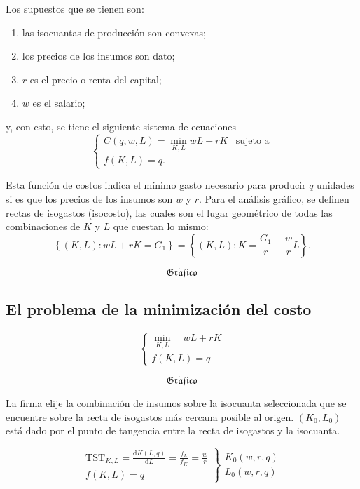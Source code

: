 \documentclass{report}
\newcommand{\GRAF}{\begin{center}$$\mathfrak{Gr\acute{a}fico}$$\end{center}}
\begin{document}
Los supuestos que se tienen son:
\setlength{\parskip}{0cm}
\begin{enumerate}
\item las isocuantas de producción son convexas;
\item los precios de los insumos son dato;
\item $r$ es el precio o renta del capital;
\item $w$ es el salario;
\end{enumerate}
\setlength{\parskip}{0.25cm}
y, con esto, se tiene el siguiente sistema de ecuaciones
\[\begin{cases}
\displaystyle{C\!\left(q,w,L\right)=\min_{K,L}wL+rK} & \text{sujeto a} \\
f\!\left(K,L\right)=q\text{.}
\end{cases}\]

Esta función de costos indica el mínimo gasto necesario para producir $q$ unidades si es que los precios de los insumos son $w$ y $r$. Para el análisis gráfico, se definen rectas de isogastos (isocosto), las cuales son el lugar geométrico de todas las combinaciones de $K$ y $L$ que cuestan lo mismo:
\[
\left\{\left(K,L\right):wL+rK=G_1\right\}=\left\{\left(K,L\right):K=\dfrac{G_1}{r}-\dfrac{w}{r}L\right\}\text{.}
\]
\GRAF


\subsection{El problema de la minimización del costo}

\[\begin{cases}
    \min\limits_{K,L} \quad wL + rK\\
    f\!\left( K,L \right) = q
\end{cases}\]

\GRAF

La firma elije la combinación de insumos sobre la isocuanta seleccionada que se encuentre sobre la recta de isogastos más cercana posible al origen.
$\left( K_0,L_0 \right) $ está dado por el punto de tangencia entre la recta de isogastos y la isocuanta.

\[
\left.
    \begin{aligned}
        \mathrm{TST}_{K,L} = \frac{\mathrm{d}K\!\left( L,q \right) }{\mathrm{d}L}=\frac{f_L}{f_K}=\frac{w}{r}\\
        f\!\left( K,L \right) = q
    \end{aligned}   
\right\}
\begin{aligned}
    K_0\!\left( w,r,q \right) \\
    L_0\!\left( w,r,q \right) 
\end{aligned}
\]
\end{document}
